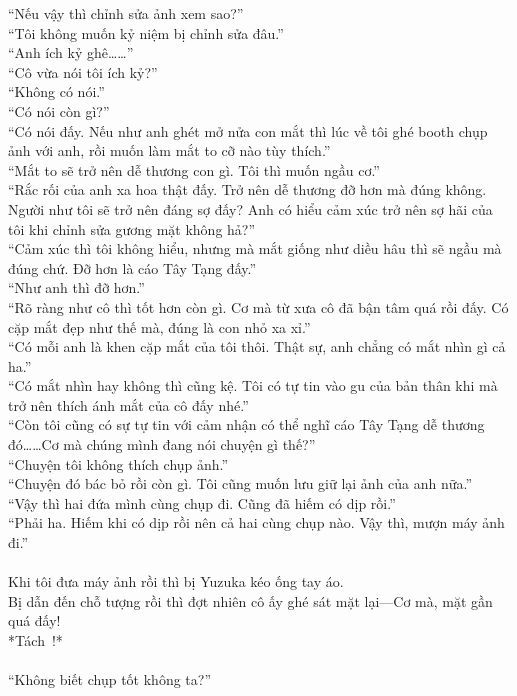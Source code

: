 \documentclass[12pt,a4paper, twosides]{book}
\begin{document}
“Nếu vậy thì chỉnh sửa ảnh xem sao?”\\
“Tôi không muốn kỷ niệm bị chỉnh sửa đâu.”\\
“Anh ích kỷ ghê……”\\
“Cô vừa nói tôi ích kỷ?”\\
“Không có nói.”\\
“Có nói còn gì?”\\
“Có nói đấy. Nếu như anh ghét mở nửa con mắt thì lúc về tôi ghé booth chụp ảnh với anh, rồi muốn làm mắt to cỡ nào tùy thích.”\\
“Mắt to sẽ trở nên dễ thương con gì. Tôi thì muốn ngầu cơ.”\\
“Rắc rối của anh xa hoa thật đấy. Trở nên dễ thương đỡ hơn mà đúng không. Người như tôi sẽ trở nên đáng sợ đấy? Anh có hiểu cảm xúc trở nên sợ hãi của tôi khi chỉnh sửa gương mặt không hả?”\\
“Cảm xúc thì tôi không hiểu, nhưng mà mắt giống như diều hâu thì sẽ ngầu mà đúng chứ. Đỡ hơn là cáo Tây Tạng đấy.”\\
“Như anh thì đỡ hơn.”\\
“Rõ ràng như cô thì tốt hơn còn gì. Cơ mà từ xưa cô đã bận tâm quá rồi đấy. Có cặp mắt đẹp như thế mà, đúng là con nhỏ xa xỉ.”\\
“Có mỗi anh là khen cặp mắt của tôi thôi. Thật sự, anh chẳng có mắt nhìn gì cả ha.”\\
“Có mắt nhìn hay không thì cũng kệ. Tôi có tự tin vào gu của bản thân khi mà trở nên thích ánh mắt của cô đấy nhé.”\\
“Còn tôi cũng có sự tự tin với cảm nhận có thể nghĩ cáo Tây Tạng dễ thương đó……Cơ mà chúng mình đang nói chuyện gì thế?”\\
“Chuyện tôi không thích chụp ảnh.”\\
“Chuyện đó bác bỏ rồi còn gì. Tôi cũng muốn lưu giữ lại ảnh của anh nữa.”\\
“Vậy thì hai đứa mình cùng chụp đi. Cũng đã hiếm có dịp rồi.”\\
“Phải ha. Hiếm khi có dịp rồi nên cả hai cùng chụp nào. Vậy thì, mượn máy ảnh đi.”\\
\\
Khi tôi đưa máy ảnh rồi thì bị Yuzuka kéo ống tay áo.\\
Bị dẫn đến chỗ tượng rồi thì đợt nhiên cô ấy ghé sát mặt lại—Cơ mà, mặt gần quá đấy!\\
*Tách~!*\\
\\
“Không biết chụp tốt không ta?”\\
\end{document}
